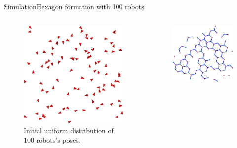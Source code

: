 \documentclass[10pt]{beamer}
\begin{document}
\begin{frame}{Simulation}{Hexagon formation with 100 robots}
  \begin{block}{}
    \begin{columns}[T] %
      \begin{column}{.5\textwidth}
        \begin{figure}
          \centering
          \includegraphics[scale=0.45]{figs/initial-formation}
          \caption{Initial uniform distribution of $100$ robots's
            poses.}
        \end{figure}
      \end{column}%
      \begin{column}{.5\textwidth}   
        \begin{figure}
            \centering
            \includegraphics[width=0.85\linewidth]{figs/formation-100}

\end{figure}
\end{column}
\end{columns}
\end{block}
\end{frame}
\end{document}
